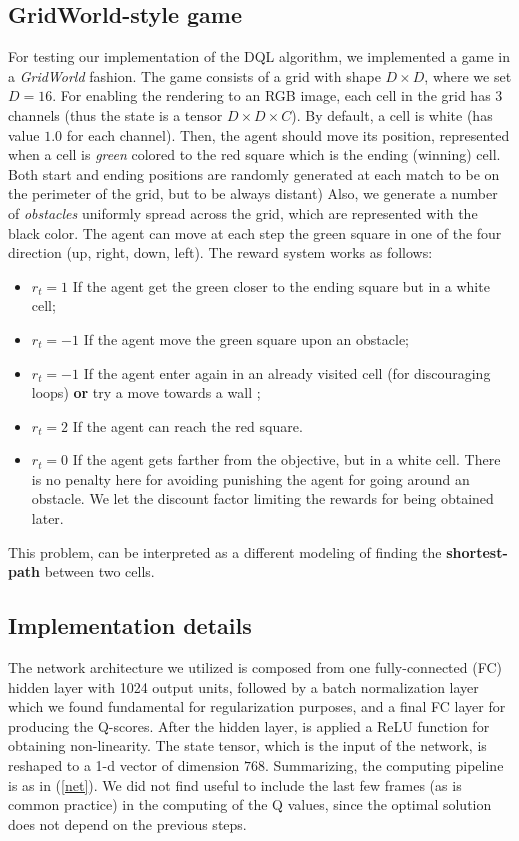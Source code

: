 \documentclass{article}
\begin{document}
\subsection{GridWorld-style game}
For testing our implementation of the DQL algorithm, we implemented a game in a \textit{GridWorld} fashion. The game consists of a grid with shape $D \times D$, where we set $D = 16$. For enabling the rendering to an RGB image, each cell in the grid has $3$ channels (thus the state is a tensor $D \times D \times C$). By default, a cell is white (has value $1.0$ for each channel). Then, the agent should move its position, represented when a cell is \textit{green} colored to the red square which is the ending (winning) cell. Both start and ending positions are randomly generated at each match to be on the perimeter of the grid, but to be always distant)  Also, we generate a number of \textit{obstacles} uniformly spread across the grid, which are represented with the black color. The agent can move at each step the green square in one of the four direction (up, right, down, left).
The reward system works as follows:
\begin{itemize}
	\item $r_t = 1$ If the agent get the green closer to the ending square but in a white cell;
	\item $r_t = -1$ If the agent move the green square upon an obstacle;
	\item $r_t = -1$ If the agent enter again in an already visited cell (for discouraging loops) \textbf{or} try a move towards a wall ;
	\item $r_t = 2$ If the agent can reach the red square.
	\item $r_t = 0$ If the agent gets farther from the objective, but in a white cell. There is no penalty here for avoiding punishing the agent for going around an obstacle. We let the discount factor limiting the rewards for being obtained later.
\end{itemize}
This problem, can be interpreted as a different modeling of finding the \textbf{shortest-path} between two cells.

\subsection{Implementation details}
The network architecture we utilized is composed from one fully-connected (FC) hidden layer with 1024 output units, followed by a batch normalization layer which we found fundamental for regularization purposes, and a final FC layer for producing the Q-scores. After the hidden layer, is applied a ReLU function for obtaining non-linearity. The state tensor, which is the input of the network, is reshaped to a 1-d vector of dimension $768$. Summarizing, the computing pipeline is as in (\ref{net}). We did not find useful to include the last few frames (as is common practice) in the computing of the Q values, since the optimal solution does not depend on the previous steps.
\end{document}
